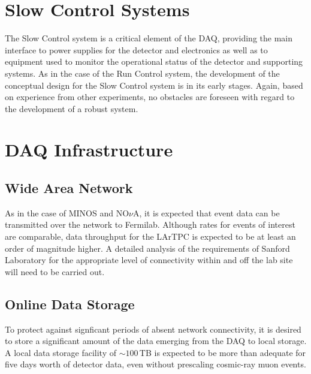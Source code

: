 \section{Slow Control Systems }
\label{sec:v5-trig-slowcontrol}

The Slow Control system is a critical element of the DAQ, providing the 
main interface to power supplies for the detector and electronics as well  
as to equipment used to monitor the operational status of the detector and 
supporting systems.  As in the case of the Run Control system, the 
development of the conceptual design for the Slow Control system is in 
its early stages.  Again, based on experience from other experiments, 
no obstacles are foreseen with regard to the development of a robust 
system.

\section{DAQ Infrastructure }
\label{sec:v5-trig-infrastructure}

\subsection{Wide Area Network}

As in the case of MINOS and NO$\nu$A, it is expected that event data can be 
transmitted over the network to Fermilab.  Although rates for events of 
interest are comparable, data throughput for the \LBNE LArTPC is 
expected to be at least an order of magnitude higher.  A detailed 
analysis of the requirements of Sanford Laboratory for the appropriate level of 
connectivity within and off the lab site will need to be carried out.

\subsection{Online Data Storage}

To protect against signficant periods of absent network connectivity, it 
is desired to store a significant amount of the data emerging from the 
DAQ to local storage.  A local data storage facility of $\sim 100\,$TB is 
expected to be more than adequate for five days worth of detector data, 
even without prescaling cosmic-ray muon events.

